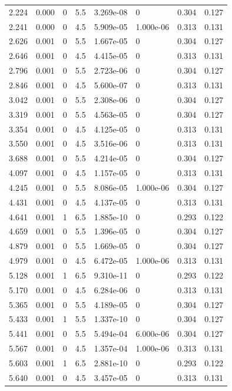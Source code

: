 \documentclass[preview]{standalone}
\begin{document}
{{\begin{tabular}{L{1.2cm}C{1.2cm} C{0.3cm}C{0.5cm} C{1.4cm}C{1.4cm} C{1.4cm}C{1.4cm}}
  2.224  &  0.000  & 0     & 5.5 &  3.269e-08  & 0  & 0.304 &  0.127   \\ 
  2.241  &  0.000  & 0     & 4.5 &  5.909e-05  & 1.000e-06  & 0.313 &  0.131   \\ 
  2.626  &  0.001  & 0     & 5.5 &  1.667e-05  & 0  & 0.304 &  0.127   \\ 
  2.646  &  0.001  & 0     & 4.5 &  4.415e-05  & 0  & 0.313 &  0.131   \\ 
  2.796  &  0.001  & 0     & 5.5 &  2.723e-06  & 0  & 0.304 &  0.127   \\ 
  2.846  &  0.001  & 0     & 4.5 &  5.600e-07  & 0  & 0.313 &  0.131   \\ 
  3.042  &  0.001  & 0     & 5.5 &  2.308e-06  & 0  & 0.304 &  0.127   \\ 
  3.319  &  0.001  & 0     & 5.5 &  4.563e-05  & 0  & 0.304 &  0.127   \\ 
  3.354  &  0.001  & 0     & 4.5 &  4.125e-05  & 0  & 0.313 &  0.131   \\ 
  3.550  &  0.001  & 0     & 4.5 &  3.516e-06  & 0  & 0.313 &  0.131   \\ 
  3.688  &  0.001  & 0     & 5.5 &  4.214e-05  & 0  & 0.304 &  0.127   \\ 
  4.097  &  0.001  & 0     & 4.5 &  1.157e-05  & 0  & 0.313 &  0.131   \\ 
  4.245  &  0.001  & 0     & 5.5 &  8.086e-05  & 1.000e-06  & 0.304 &  0.127   \\ 
  4.431  &  0.001  & 0     & 4.5 &  4.137e-05  & 0  & 0.313 &  0.131   \\ 
  4.641  &  0.001  & 1     & 6.5 &  1.885e-10  & 0  & 0.293 &  0.122   \\ 
  4.659  &  0.001  & 0     & 5.5 &  1.396e-05  & 0  & 0.304 &  0.127   \\ 
  4.879  &  0.001  & 0     & 5.5 &  1.669e-05  & 0  & 0.304 &  0.127   \\ 
  4.979  &  0.001  & 0     & 4.5 &  6.472e-05  & 1.000e-06  & 0.313 &  0.131   \\ 
  5.128  &  0.001  & 1     & 6.5 &  9.310e-11  & 0  & 0.293 &  0.122   \\ 
  5.170  &  0.001  & 0     & 4.5 &  6.284e-06  & 0  & 0.313 &  0.131   \\ 
  5.365  &  0.001  & 0     & 5.5 &  4.189e-05  & 0  & 0.304 &  0.127   \\ 
  5.433  &  0.001  & 1     & 5.5 &  1.337e-10  & 0  & 0.304 &  0.127   \\ 
  5.441  &  0.001  & 0     & 5.5 &  5.494e-04  & 6.000e-06  & 0.304 &  0.127   \\ 
  5.567  &  0.001  & 0     & 4.5 &  1.357e-04  & 1.000e-06  & 0.313 &  0.131   \\ 
  5.603  &  0.001  & 1     & 6.5 &  2.881e-10  & 0  & 0.293 &  0.122   \\ 
  5.640  &  0.001  & 0     & 4.5 &  3.457e-05  & 0  & 0.313 &  0.131   \\ 
\hline 
\end{tabular} 

}}
\end{document}
